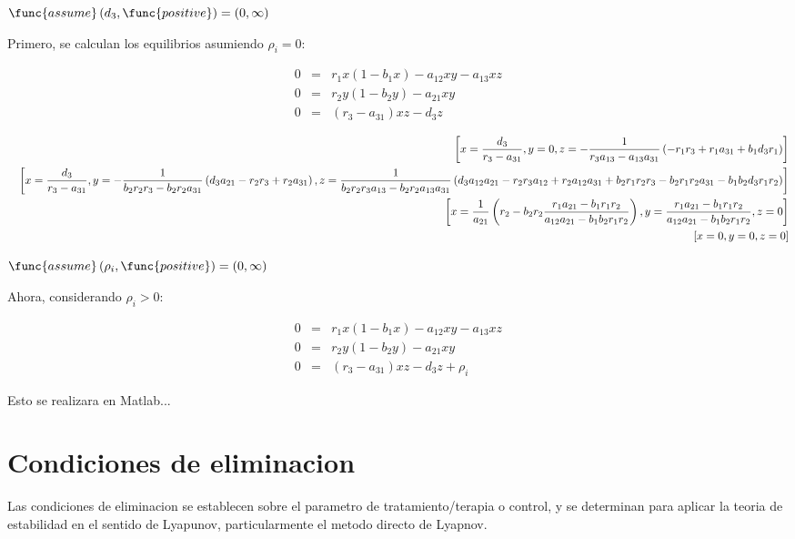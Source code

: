 \documentclass[letterpaper,11pt]{article}
\begin{document}
$\func{assume}\left( d_{3},\func{positive}\right) =\allowbreak \left(
0,\infty \right) $

\bigskip Primero, se calculan los equilibrios asumiendo $\rho _{i}=0:$

\begin{eqnarray*}
0 &=&r_{1}x(1-b_{1}x)-a_{12}xy-a_{13}xz \\
0 &=&r_{2}y(1-b_{2}y)-a_{21}xy \\
0 &=&(r_{3}-a_{31})xz-d_{3}z
\end{eqnarray*}

\begin{eqnarray*}
&&\left[ x=\frac{d_{3}}{r_{3}-a_{31}},y=0,z=-\frac{1}{%
r_{3}a_{13}-a_{13}a_{31}}\left(
-r_{1}r_{3}+r_{1}a_{31}+b_{1}d_{3}r_{1}\right) \right] \\
&&\left[ x=\frac{d_{3}}{r_{3}-a_{31}},y=-\frac{1}{%
b_{2}r_{2}r_{3}-b_{2}r_{2}a_{31}}\left(
d_{3}a_{21}-r_{2}r_{3}+r_{2}a_{31}\right) ,z=\frac{1}{%
b_{2}r_{2}r_{3}a_{13}-b_{2}r_{2}a_{13}a_{31}}\left(
d_{3}a_{12}a_{21}-r_{2}r_{3}a_{12}+r_{2}a_{12}a_{31}+b_{2}r_{1}r_{2}r_{3}-b_{2}r_{1}r_{2}a_{31}-b_{1}b_{2}d_{3}r_{1}r_{2}\right) %
\right] \\
&&\left[ x=\frac{1}{a_{21}}\left( r_{2}-b_{2}r_{2}\frac{%
r_{1}a_{21}-b_{1}r_{1}r_{2}}{a_{12}a_{21}-b_{1}b_{2}r_{1}r_{2}}\right) ,y=%
\frac{r_{1}a_{21}-b_{1}r_{1}r_{2}}{a_{12}a_{21}-b_{1}b_{2}r_{1}r_{2}},z=0%
\right] \\
&&\left[ x=0,y=0,z=0\right]
\end{eqnarray*}

\bigskip $\func{assume}\left( \rho _{i},\func{positive}\right) =\allowbreak
\left( 0,\infty \right) $

Ahora, considerando $\rho _{i}>0:$

\begin{eqnarray*}
0 &=&r_{1}x(1-b_{1}x)-a_{12}xy-a_{13}xz \\
0 &=&r_{2}y(1-b_{2}y)-a_{21}xy \\
0 &=&(r_{3}-a_{31})xz-d_{3}z+\rho _{i}
\end{eqnarray*}

\bigskip Esto se realizara en Matlab...

\section{Condiciones de eliminacion}

Las condiciones de eliminacion se establecen sobre el parametro de
tratamiento/terapia o control, y se determinan para aplicar la teoria de
estabilidad en el sentido de Lyapunov, particularmente el metodo directo de
Lyapnov.
\end{document}

